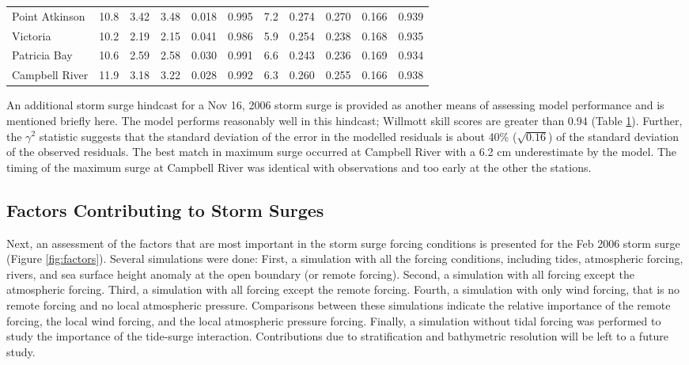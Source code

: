 \documentclass{tATO2e}
\begin{document}
\begin{table}[h]
{\begin{tabular}{|l |c c c c c | c c c c c|}
Point Atkinson &	10.8	& 3.42	& 3.48	& 0.018	& 0.995	& 7.2	& 0.274	& 0.270	& 0.166	 & 0.939 \\
Victoria       &	10.2	& 2.19	& 2.15	& 0.041	& 0.986	& 5.9	& 0.254	& 0.238	& 0.168	 & 0.935 \\
Patricia Bay   &	10.6	& 2.59	& 2.58	& 0.030	& 0.991	& 6.6	& 0.243	& 0.236	& 0.169	 & 0.934 \\
Campbell River &	11.9	& 3.18	& 3.22	& 0.028	& 0.992	& 6.3	& 0.260	& 0.255	& 0.166  & 0.938 \\
\hline
\end{tabular}}
\label{tab:statistics}
\end{table} 

An additional storm surge hindcast for a Nov 16, 2006 storm surge is provided as another means of assessing model performance and is mentioned briefly here. The model performs reasonably well in this hindcast; Willmott skill scores are greater than 0.94 (Table \ref{tab:statistics}).  Further, the $\gamma^2$ statistic suggests that the standard deviation of the error in the modelled residuals is about 40\% ($\sqrt{0.16}$) of the standard deviation of the observed residuals. The best match in maximum surge occurred at Campbell River with a 6.2 cm underestimate by the model. The timing of the maximum surge at Campbell River was identical with observations and too early at the other the stations. 


\subsection{Factors Contributing to Storm Surges}\label{sec:factors}

Next, an assessment of the factors that are most important in the storm surge forcing conditions is presented for the Feb 2006 storm surge (Figure \ref{fig:factors}). Several simulations were done: First, a simulation with all the forcing conditions, including tides, atmospheric forcing, rivers, and sea surface height anomaly at the open boundary (or remote forcing). Second, a simulation with all forcing except the atmospheric forcing. Third, a simulation with all forcing except the remote forcing. Fourth, a simulation with only wind forcing, that is no remote forcing and no local atmospheric pressure. Comparisons between these simulations indicate the relative importance of the remote forcing, the local wind forcing, and the local atmospheric pressure forcing. Finally, a simulation without tidal forcing was performed to study the importance of the tide-surge interaction. Contributions due to stratification and bathymetric resolution will be left to a future study. 
\end{document}
